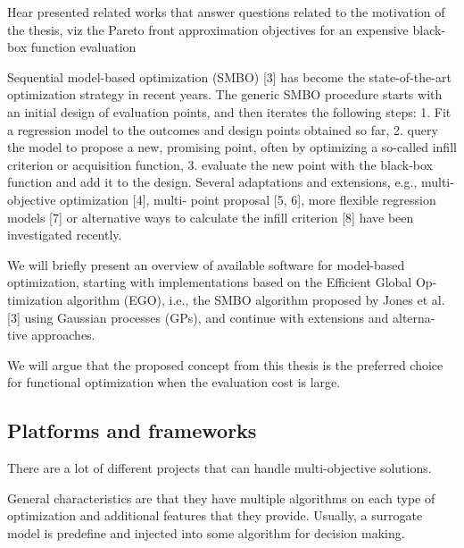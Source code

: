     Hear presented related works that answer questions related to the motivation of the thesis, viz the Pareto front approximation objectives for an expensive black-box function evaluation

    Sequential model-based optimization (SMBO) [3] has become the state-of-the-art optimization strategy in recent years.
    The generic SMBO procedure starts with an initial design of evaluation
    points, and then iterates the following steps: 1. Fit a regression model to the outcomes and design points obtained so far,
    2. query the model to propose a new, promising point, often by optimizing a so-called infill criterion or acquisition function,
    3. evaluate the new point with the black-box function and add it to the design.
    Several adaptations and extensions, e.g., multi-objective optimization [4], multi- point proposal [5, 6], more flexible regression models [7] or alternative ways to calculate the infill criterion [8] have been investigated recently.



    We will briefly present an overview of available software for model-based optimization, starting with implementations based on the Efficient Global Op- timization algorithm (EGO), i.e., the SMBO algorithm proposed by Jones et al. [3] using Gaussian processes (GPs), and continue with extensions and alterna- tive approaches.

    We will argue that the proposed concept from this thesis is the preferred choice for functional optimization when the evaluation cost is large.



    \subsection{Platforms and frameworks}
        There are a lot of different projects that can handle multi-objective solutions.

        General characteristics are that they have multiple algorithms on each type of optimization and additional features that they provide. Usually, a surrogate model is predefine and injected into some algorithm for decision making.

